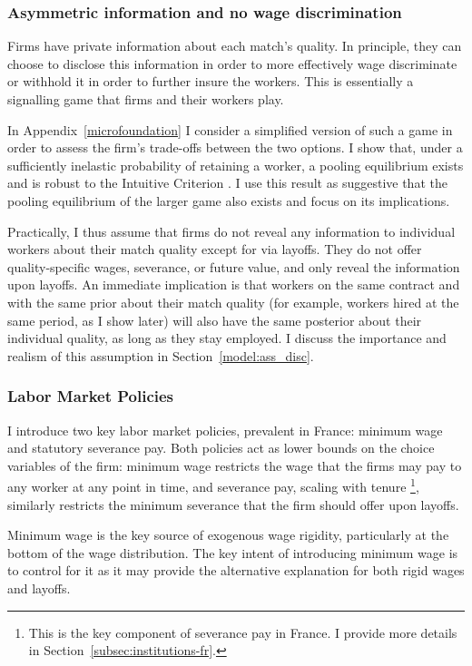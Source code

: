 \subsubsection*{Asymmetric information and no wage discrimination}
Firms have private information about each match's quality. In principle, they can choose to disclose this information in order to more effectively wage discriminate or withhold it in order to further insure the workers. This is essentially a signalling game that firms and their workers play.

In Appendix~\ref{microfoundation} I consider a simplified version of such a game in order to assess the firm's trade-offs between the two options. I show that, under a sufficiently inelastic probability of retaining a worker, a pooling equilibrium exists and is robust to the Intuitive Criterion \parencite{Cho1987}. I use this result as suggestive that the pooling equilibrium of the larger game also exists and focus on its implications. 

Practically, I thus assume that firms do not reveal any information to individual workers about their match quality except for via layoffs. They do not offer quality-specific wages, severance, or future value, and only reveal the information upon layoffs. An immediate implication is that workers on the same contract and with the same prior about their match quality (for example, workers hired at the same period, as I show later) will also have the same posterior about their individual quality, as long as they stay employed. I discuss the importance and realism of this assumption in Section~\ref{model:ass_disc}.

\subsubsection*{Labor Market Policies}
I introduce two key labor market policies, prevalent in France: minimum wage and statutory severance pay. Both policies act as lower bounds on the choice variables of the firm: minimum wage restricts the wage that the firms may pay to any worker at any point in time, and severance pay, scaling with tenure \footnote{This is the key component of severance pay in France. I provide more details in Section~\ref{subsec:institutions-fr}.}, similarly restricts the minimum severance that the firm should offer upon layoffs.

Minimum wage is the key source of exogenous wage rigidity, particularly at the bottom of the wage distribution.  The key intent of introducing minimum wage is to control for it as it may provide the alternative explanation for both rigid wages and layoffs. 

